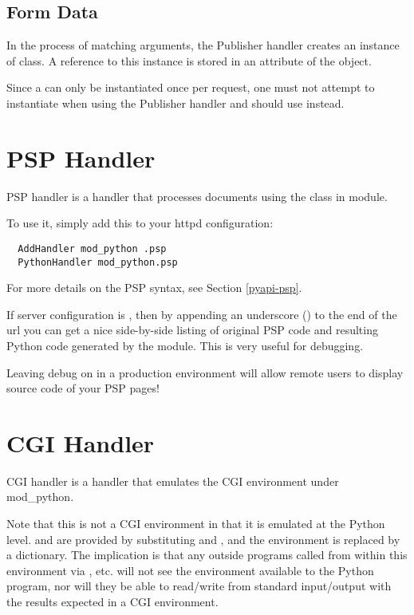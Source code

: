 \subsection{Form Data}

In the process of matching arguments, the Publisher handler creates an
instance of 
class. A reference to this instance is stored in an attribute 
of the  object.

Since a  can only be instantiated once per
request, one must not attempt to instantiate  when
using the Publisher handler and should use
 instead.


\section{PSP Handler\label{hand-psp}}

PSP handler is a handler that processes documents using the
 class in  module.

To use it, simply add this to your httpd configuration: 

\begin{verbatim}
  AddHandler mod_python .psp
  PythonHandler mod_python.psp
\end{verbatim}

For more details on the PSP syntax, see Section \ref{pyapi-psp}.

If  server configuration is , then by
appending an underscore (\samp{_}) to the end of the url you can get a
nice side-by-side listing of original PSP code and resulting Python
code generated by the  module. This is very useful for
debugging.

\begin{notice}
Leaving debug on in a production environment will allow remote users
to display source code of your PSP pages!
\end{notice}

\section{CGI Handler\label{hand-cgi}}


CGI handler is a handler that emulates the CGI environment under mod_python. 

Note that this is not a  CGI environment in that it is
emulated at the Python level.  and  are
provided by substituting  and , and
the environment is replaced by a dictionary. The implication is that
any outside programs called from within this environment via
, etc. will not see the environment available to the
Python program, nor will they be able to read/write from standard
input/output with the results expected in a  CGI environment.

